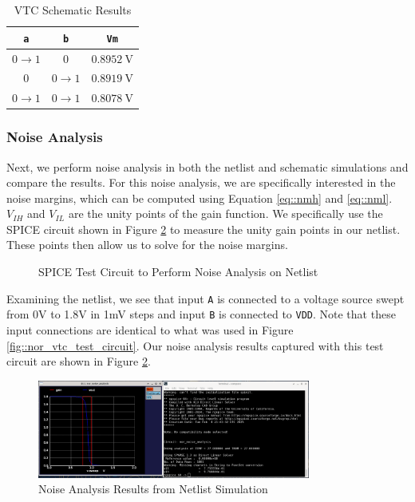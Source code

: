 \documentclass{article}
\begin{document}
	\begin{table}[H]
	\begin{center}
	\caption{VTC Schematic Results}
	\label{table::nor_vtc_schematic}
	\begin{tabular}{| c | c | c |}
		\hline
		\texttt{a} & \texttt{b} & \texttt{Vm}\\
		\hline	
		$0 \rightarrow 1$ & $0$ & $0.8952\ \text{V}$\\
		\hline	
		$0$ & $0 \rightarrow 1$ & $0.8919\ \text{V}$\\
		\hline	
		$0 \rightarrow 1$ & $0 \rightarrow 1$ & $0.8078\ \text{V}$\\
		\hline
	\end{tabular}
	\end{center}
	\end{table}
	
	\subsubsection{Noise Analysis}
	
	Next, we perform noise analysis in both the netlist and schematic simulations and compare the results. For this noise analysis, we are specifically interested in the noise margins, which can be computed using Equation \ref{eq::nmh} and \ref{eq::nml}. $V_{IH}$ and $V_{IL}$ are the unity points of the gain function. We specifically use the SPICE circuit shown in Figure \ref{fig::nor_noise_analysis} to measure the unity gain points in our netlist. These points then allow us to solve for the noise margins.	
	
	\begin{figure}[H]
		
		\caption{SPICE Test Circuit to Perform Noise Analysis on Netlist}
		\label{fig::nor_noise_analysis_test_circuit}
	\end{figure}
	
	Examining the netlist, we see that input \texttt{A} is connected to a voltage source swept from 0V to 1.8V in 1mV steps and input \texttt{B} is connected to \texttt{VDD}. Note that these input connections are identical to what was used in Figure \ref{fig::nor_vtc_test_circuit}. Our noise analysis results captured with this test circuit are shown in Figure \ref{fig::nor_noise_analysis}.
	
	\begin{figure}[H]
		\centerline{\includegraphics[width=0.8\textwidth]{nor_noise_analysis.png}}
		\caption{Noise Analysis Results from Netlist Simulation}
		\label{fig::nor_noise_analysis}
	\end{figure}
	
\end{document}
